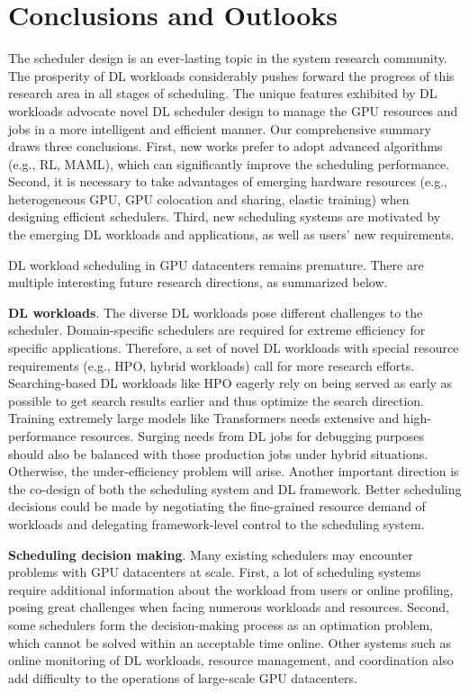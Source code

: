 \section{Conclusions and Outlooks}
\label{sec_conclusion}




The scheduler design is an ever-lasting topic in the system research community. The prosperity of DL workloads considerably pushes forward the progress of this research area in all stages of scheduling.
The unique features exhibited by DL workloads advocate novel DL scheduler design to manage the GPU resources and jobs in a more intelligent and efficient manner. Our comprehensive summary draws three conclusions. First, new works prefer to adopt advanced algorithms (e.g., RL, MAML), which can significantly improve the scheduling performance. Second, it is necessary to take advantages of emerging hardware resources (e.g., heterogeneous GPU, GPU colocation and sharing, elastic training) when designing efficient schedulers. Third, new scheduling systems are motivated by the emerging DL workloads and applications, as well as users' new requirements. 

DL workload scheduling in GPU datacenters remains premature. There are multiple interesting future research directions, as summarized below. 




\textbf{DL workloads}. The diverse DL workloads pose different challenges to the scheduler. Domain-specific schedulers are required for extreme efficiency for specific applications. Therefore, a set of novel DL workloads with special resource requirements (e.g., HPO, hybrid workloads) call for more research efforts. Searching-based DL workloads like HPO eagerly rely on being served as early as possible to get search results earlier and thus optimize the search direction. Training extremely large models like Transformers needs extensive and high-performance resources. Surging needs from DL jobs for debugging purposes should also be balanced with those production jobs under hybrid situations. Otherwise, the under-efficiency problem will arise. Another important direction is the co-design of both the scheduling system and DL framework. Better scheduling decisions could be made by negotiating the fine-grained resource demand of workloads and delegating framework-level control to the scheduling system.

\textbf{Scheduling decision making}. Many existing schedulers may encounter problems with GPU datacenters at scale. First, a lot of scheduling systems require additional information about the workload from users or online profiling, posing great challenges when facing numerous workloads and resources. Second, some schedulers form the decision-making process as an optimation problem, which cannot be solved within an acceptable time online. Other systems such as online monitoring of DL workloads, resource management, and coordination also add difficulty to the operations of large-scale GPU datacenters.

